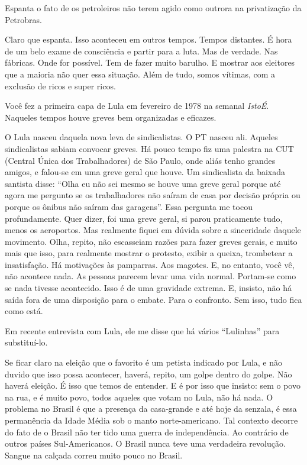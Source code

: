  Espanta o fato de os petroleiros não terem agido como outrora na
privatização da Petrobras.

 Claro que espanta. Isso aconteceu em outros tempos. Tempos distantes.
É hora de um belo exame de consciência e partir para a luta. Mas de
verdade. Nas fábricas. Onde for possível. Tem de fazer muito barulho. E
mostrar aos eleitores que a maioria não quer essa situação. Além de
tudo, somos vítimas, com a exclusão de ricos e super ricos.

 Você fez a primeira capa de Lula em fevereiro de 1978 na semanal
\emph{IstoÉ}. Naqueles tempos houve greves bem organizadas e eficazes.

 O Lula nasceu daquela nova leva de sindicalistas. O PT nasceu ali.
Aqueles sindicalistas sabiam convocar greves. Há pouco tempo fiz uma
palestra na CUT (Central Única dos Trabalhadores) de São Paulo, onde
aliás tenho grandes amigos, e falou-se em uma greve geral que houve. Um
sindicalista da baixada santista disse: ``Olha eu não sei mesmo se houve
uma greve geral porque até agora me pergunto se os trabalhadores não
saíram de casa por decisão própria ou porque os ônibus não saíram das
garagens''. Essa pergunta me tocou profundamente. Quer dizer, foi uma
greve geral, si parou praticamente tudo, menos os aeroportos. Mas
realmente fiquei em dúvida sobre a sinceridade daquele movimento. Olha,
repito, não escasseiam razões para fazer greves gerais, e muito mais que
isso, para realmente mostrar o protesto, exibir a queixa, trombetear a
insatisfação. Há motivações às pamparras. Aos magotes. E, no entanto,
você vê, não acontece nada. As pessoas parecem levar uma vida normal.
Portam-se como se nada tivesse acontecido. Isso é de uma gravidade
extrema. E, insisto, não há saída fora de uma disposição para o embate.
Para o confronto. Sem isso, tudo fica como está.

 Em recente entrevista com Lula, ele me disse que há vários
``Lulinhas'' para substituí-lo.

 Se ficar claro na eleição que o favorito é um petista indicado por
Lula, e não duvido que isso possa acontecer, haverá, repito, um golpe
dentro do golpe. Não haverá eleição. É isso que temos de entender. E é
por isso que insisto: sem o povo na rua, e é muito povo, todos aqueles
que votam no Lula, não há nada. O problema no Brasil é que a presença da
casa-grande e até hoje da senzala, é essa permanência da Idade Média sob
o manto norte-americano. Tal contexto decorre do fato de o Brasil não
ter tido uma guerra de independência. Ao contrário de outros países
Sul-Americanos. O Brasil nunca teve uma verdadeira revolução. Sangue na
calçada correu muito pouco no Brasil.

